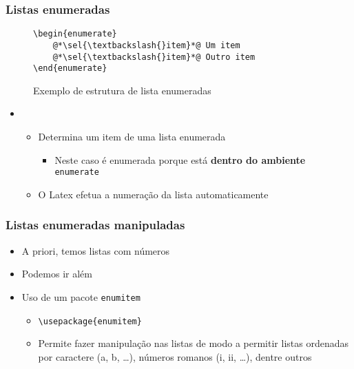 \begin{frame}[fragile] \frametitle{Listas enumeradas}
\begin{figure}[!t]
\caption{Exemplo de estrutura de lista enumeradas}
\begin{lstlisting}
\begin{enumerate}
	@*\sel{\textbackslash{}item}*@ Um item
	@*\sel{\textbackslash{}item}*@ Outro item
\end{enumerate}
\end{lstlisting}
\ownsrc
\end{figure}

\begin{itemize}
	\item {}
	\begin{itemize}
		\item Determina um item de uma lista enumerada
		\begin{itemize}
			\item Neste caso é enumerada porque está \textbf{dentro do ambiente} \texttt{enumerate}
		\end{itemize}
		\item O Latex efetua a numeração da lista automaticamente
	\end{itemize}
\end{itemize}
\end{frame}

\begin{frame}[fragile] \frametitle{Listas enumeradas manipuladas}

\begin{itemize}
	\item A priori, temos listas com números
	\item Podemos ir além
	\item Uso de um pacote \texttt{enumitem}
	\begin{itemize}
		\item \texttt{\textbackslash{}usepackage\{enumitem\}}
		\item Permite fazer manipulação nas listas de modo a permitir listas ordenadas por caractere (a, b, \ldots), números romanos (i, ii, \ldots), dentre outros
	\end{itemize}
\end{itemize}
\end{frame}

